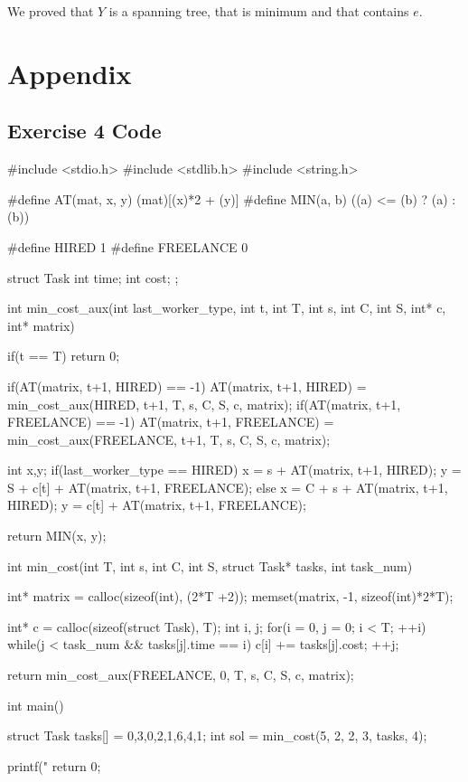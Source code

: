 \documentclass[paper=a4, fontsize=11pt]{scrartcl} %
\numberwithin{equation}{section} %
\numberwithin{figure}{section} %
\numberwithin{table}{section} %
\begin{document}
We proved that $Y$ is a spanning tree, that is minimum and that contains $e$.

\newpage

\section*{Appendix}

\subsection*{Exercise 4 Code}

\begin{ccode}
#include <stdio.h>
#include <stdlib.h>
#include <string.h>

#define AT(mat, x, y) (mat)[(x)*2 + (y)]
#define MIN(a, b) ((a) <= (b) ? (a) : (b))

#define HIRED 1
#define FREELANCE 0

struct Task
{
    int time;
    int cost;
};

int min_cost_aux(int last_worker_type, int t, int T, int s, int C, int S, int* c, int* matrix)
{
  if(t == T)
    return 0;
  
  if(AT(matrix, t+1, HIRED) == -1)
    AT(matrix, t+1, HIRED) = min_cost_aux(HIRED, t+1, T, s, C, S, c, matrix);
  if(AT(matrix, t+1, FREELANCE) == -1)
    AT(matrix, t+1, FREELANCE) = min_cost_aux(FREELANCE, t+1, T, s, C, S, c, matrix);
  
  int x,y;
  if(last_worker_type == HIRED) {
    x = s + AT(matrix, t+1, HIRED);
    y = S + c[t] + AT(matrix, t+1, FREELANCE);
  }
  else {
    x = C + s + AT(matrix, t+1, HIRED);
    y = c[t] + AT(matrix, t+1, FREELANCE);
  }
  
  return MIN(x, y);
}


int min_cost(int T, int s, int C, int S, struct Task* tasks, int task_num)
{
    int* matrix = calloc(sizeof(int), (2*T +2));
    memset(matrix, -1, sizeof(int)*2*T);
    
    int* c = calloc(sizeof(struct Task), T);
    int i, j;
    for(i = 0, j = 0; i < T; ++i) {
        while(j < task_num && tasks[j].time == i) {
            c[i] += tasks[j].cost;
            ++j;
        }
    }
    
    return min_cost_aux(FREELANCE, 0, T, s, C, S, c, matrix);
}

int main()
{
    struct Task tasks[] = {{0,3},{0,2},{1,6},{4,1}};
    int sol = min_cost(5, 2, 2, 3, tasks, 4);
    
    printf("%
    return 0;
}
\end{ccode}
\end{document}
